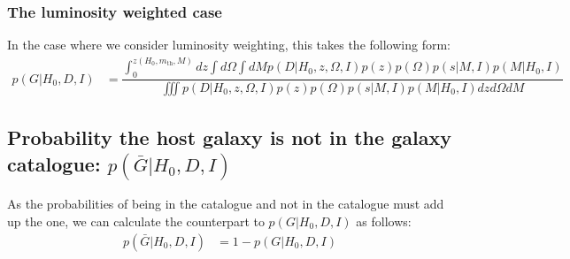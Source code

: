 \documentclass[a4paper,10pt]{article}
\begin{document}
{\subsubsection{The luminosity weighted case}
In the case where we consider luminosity weighting, this takes the following form:
\begin{equation}
\begin{aligned}
p(G|H_0,D,I) &= \dfrac{\int^{z(H_0,m_{\text{th}},M)}_0 dz \int d\Omega \int dM p(D|H_0,z,\Omega,I) p(z)p(\Omega) p(s|M,I) p(M|H_0,I)}{\iiint p(D|H_0,z,\Omega,I) p(z)p(\Omega) p(s|M,I) p(M|H_0,I) dz d\Omega dM}
\end{aligned}
\end{equation}


\subsection{Probability the host galaxy is not in the galaxy catalogue: $p(\bar{G}|H_0,D,I)$}

As the probabilities of being in the catalogue and not in the catalogue must add up the one, we can calculate the counterpart to $p(G|H_0,D,I)$ as follows:
\begin{equation}
\begin{aligned}
p(\bar{G}|H_0,D,I) &= 1 - p(G|H_0,D,I)
\end{aligned}
\end{equation}








}
\end{document}
